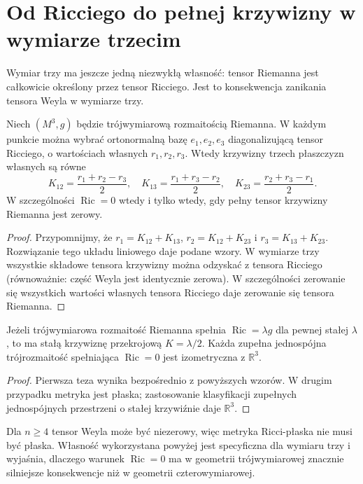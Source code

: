\section{Od Ricciego do pełnej krzywizny w wymiarze trzecim}
\label{sec:thurston-ricci}

Wymiar trzy ma jeszcze jedną niezwykłą własność: tensor Riemanna
jest całkowicie określony przez tensor Ricciego. Jest to konsekwencja
zanikania tensora Weyla w wymiarze trzy.

\begin{twierdzenie}
Niech $(M^3,g)$ będzie trójwymiarową rozmaitością Riemanna.
W każdym punkcie można wybrać ortonormalną bazę
$e_1,e_2,e_3$ diagonalizującą tensor Ricciego, o wartościach
własnych $r_1,r_2,r_3$. Wtedy krzywizny trzech płaszczyzn
własnych są równe
\[
K_{12}=\frac{r_1+r_2-r_3}{2},\quad
K_{13}=\frac{r_1+r_3-r_2}{2},\quad
K_{23}=\frac{r_2+r_3-r_1}{2}.
\]
W szczególności $\operatorname{Ric}=0$ wtedy i tylko wtedy,
gdy pełny tensor krzywizny Riemanna jest zerowy.
\end{twierdzenie}
\begin{proof}
Przypomnijmy, że
$r_1=K_{12}+K_{13}$,
$r_2=K_{12}+K_{23}$ i
$r_3=K_{13}+K_{23}$.
Rozwiązanie tego układu liniowego daje podane wzory.
W wymiarze trzy wszystkie składowe tensora krzywizny można
odzyskać z tensora Ricciego (równoważnie: część Weyla jest
identycznie zerowa). W szczególności zerowanie się wszystkich
wartości własnych tensora Ricciego daje zerowanie się tensora
Riemanna.
\end{proof}

\begin{wniosek}
Jeżeli trójwymiarowa rozmaitość Riemanna spełnia
$\operatorname{Ric}=\lambda g$ dla pewnej stałej $\lambda$,
to ma stałą krzywiznę przekrojową $K=\lambda/2$.
Każda zupełna jednospójna trójrozmaitość spełniająca
$\operatorname{Ric}=0$ jest izometryczna z $\mathbb R^3$.
\end{wniosek}
\begin{proof}
Pierwsza teza wynika bezpośrednio z powyższych wzorów.
W drugim przypadku metryka jest płaska; zastosowanie
klasyfikacji zupełnych jednospójnych przestrzeni o stałej
krzywiźnie daje $\mathbb R^3$.
\end{proof}

\begin{uwaga}
Dla $n\ge4$ tensor Weyla może być niezerowy, więc metryka
Ricci-płaska nie musi być płaska. Własność wykorzystana
powyżej jest specyficzna dla wymiaru trzy i wyjaśnia,
dlaczego warunek $\operatorname{Ric}=0$ ma w geometrii
trójwymiarowej znacznie silniejsze konsekwencje niż w
geometrii czterowymiarowej.
\end{uwaga}

